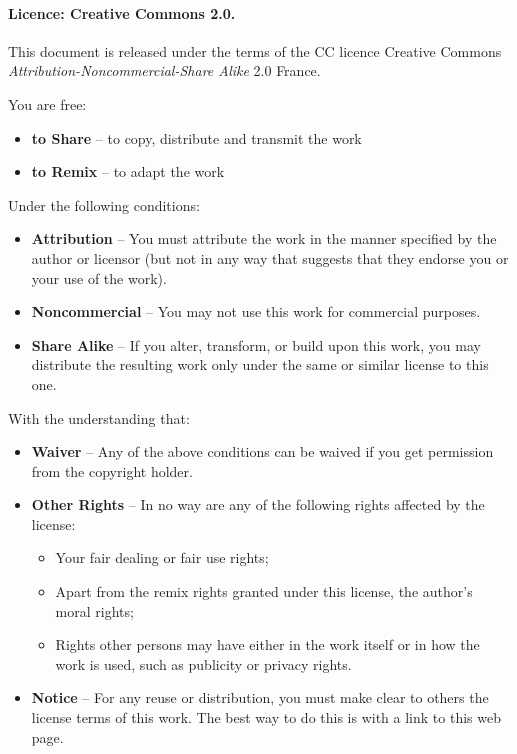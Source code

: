 
\paragraph{Licence: Creative Commons 2.0.}

{\footnotesize
This document is released under the terms of the CC licence Creative Commons \emph{Attribution-Noncommercial-Share Alike} 2.0 France.

\noindent You are free:
\begin{itemize}
\item \textbf{to Share} -- to copy, distribute and transmit the work
\item \textbf{to Remix} -- to adapt the work
\end{itemize}

\noindent Under the following conditions:
\begin{itemize}
\item \textbf{Attribution} -- You must attribute the work in the manner specified by the author or
  licensor (but not in any way that suggests that they endorse you or your use of the work).
\item \textbf{Noncommercial} -- You may not use this work for commercial purposes.
\item \textbf{Share Alike} -- If you alter, transform, or build upon this work, you may distribute
  the resulting work only under the same or similar license to this one.
\end{itemize}

\noindent With the understanding that:
\begin{itemize}
\item \textbf{Waiver} -- Any of the above conditions can be waived if you get permission from the
  copyright holder.
\item \textbf{Other Rights} -- In no way are any of the following rights affected by the license:
  \begin{itemize}
  \item Your fair dealing or fair use rights;
  \item Apart from the remix rights granted under this license,
    the author's moral rights;
  \item Rights other persons may have either in the work itself or in how the
    work is used, such as publicity or privacy rights.
  \end{itemize}

\item \textbf{Notice} -- For any reuse or distribution, you must make clear to others the license terms of this work. The best way to do this is with a link to this web page.
\end{itemize}

}



%
